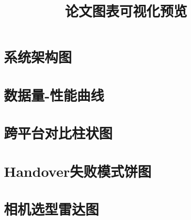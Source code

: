 \documentclass[UTF8,a4paper,12pt]{ctexart}
\title{论文图表可视化预览}
\author{}
\date{}
\begin{document}
\maketitle

\section{系统架构图}



\newpage

\section{数据量-性能曲线}



\newpage

\section{跨平台对比柱状图}



\newpage

\section{Handover失败模式饼图}



\newpage

\section{相机选型雷达图}


\end{document}
